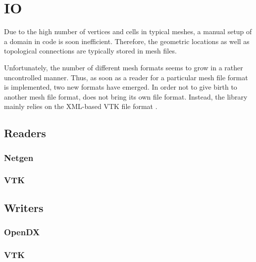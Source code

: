 \chapter{IO} \label{chap:io}
Due to the high number of vertices and cells in typical meshes,
a manual setup of a domain in code is soon inefficient. Therefore,
the geometric locations as well as topological connections are typically stored in mesh files.

Unfortunately, the number of different mesh formats seems to grow in a rather uncontrolled manner.
Thus, as soon as a reader for a particular mesh file format is implemented, two new formats have emerged.
In order not to give birth to another mesh file format, {\ViennaGrid} does not bring its own file format. 
Instead, the library mainly relies on the XML-based VTK file format \cite{VTK,VTKfileformat}.





\section{Readers}


 \subsection{Netgen}

 \subsection{VTK}



\section{Writers}


 \subsection{OpenDX}

 \subsection{VTK}

